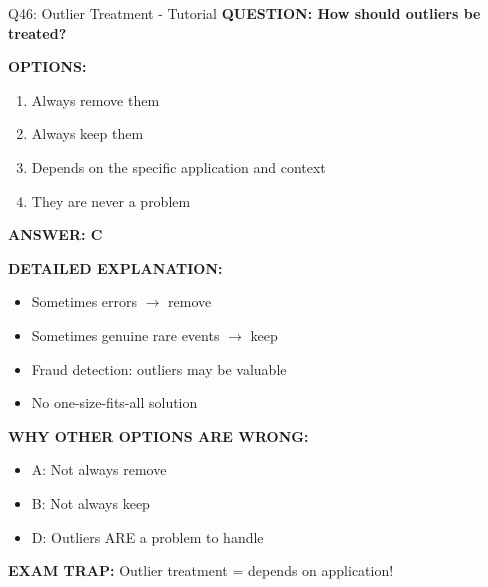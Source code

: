 \documentclass[8pt]{beamer}
\begin{document}
	\begin{frame}{Q46: Outlier Treatment - Tutorial}
		\fontsize{6.5}{7.5}\selectfont
		\textbf{QUESTION: How should outliers be treated?}
		
		\vspace{0.1cm}
		\textbf{OPTIONS:}
		\begin{enumerate}
			\item Always remove them
			\item Always keep them
			\item Depends on the specific application and context
			\item They are never a problem
		\end{enumerate}
		
		\vspace{0.1cm}
		\textcolor{myblue}{\textbf{ANSWER: C}}
		
		\vspace{0.1cm}
		\textbf{DETAILED EXPLANATION:}
		\begin{itemize}
			\item Sometimes errors $\to$ remove
			\item Sometimes genuine rare events $\to$ keep
			\item Fraud detection: outliers may be valuable
			\item No one-size-fits-all solution
		\end{itemize}
		
		\vspace{0.1cm}
		\textcolor{myred}{\textbf{WHY OTHER OPTIONS ARE WRONG:}}
		\begin{itemize}
			\item \textcolor{myred}{A:} Not always remove
			\item \textcolor{myred}{B:} Not always keep
			\item \textcolor{myred}{D:} Outliers ARE a problem to handle
		\end{itemize}
		
		\textcolor{myred}{\textbf{EXAM TRAP:}} Outlier treatment = \textcolor{myblue}{depends on application}!
	\end{frame}
	
\end{document}
